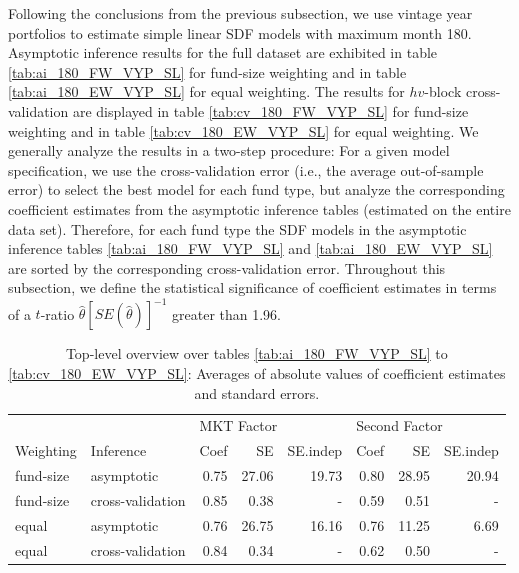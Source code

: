\documentclass[12pt]{article}
\begin{document}
Following the conclusions from the previous subsection, we use vintage year portfolios to estimate simple linear SDF models with maximum month 180.
Asymptotic inference results for the full dataset are exhibited in table \ref{tab:ai_180_FW_VYP_SL} for fund-size weighting and in table \ref{tab:ai_180_EW_VYP_SL} for equal weighting.
The results for $hv$-block cross-validation are displayed in table \ref{tab:cv_180_FW_VYP_SL} for fund-size weighting and in table \ref{tab:cv_180_EW_VYP_SL} for equal weighting.
We generally analyze the results in a two-step procedure: For a given model specification, we use the cross-validation error (i.e., the average out-of-sample error) to select the best model for each fund type, but analyze the corresponding coefficient estimates from the asymptotic inference tables (estimated on the entire data set).
Therefore, for each fund type the SDF models in the asymptotic inference tables \ref{tab:ai_180_FW_VYP_SL} and \ref{tab:ai_180_EW_VYP_SL} are sorted by the corresponding cross-validation error.
Throughout this subsection, we define the statistical significance of coefficient estimates in terms of a $t$-ratio $\hat{\theta}[SE(\hat{\theta})]^{-1}$ greater than 1.96.

\begin{table}[ht]
	\centering
	\begin{tabular}{llrrrrrr}
		& & \multicolumn{3}{l}{MKT Factor} & \multicolumn{3}{l}{Second Factor} \\ 
		Weighting & Inference & Coef & SE & SE.indep & Coef & SE & SE.indep \\ 
		\hline
		\hline
		fund-size & asymptotic & 0.75 & 27.06 & 19.73 & 0.80 & 28.95 & 20.94 \\ 
		fund-size & cross-validation & 0.85 & 0.38 & - & 0.59 & 0.51 & - \\ 
		\hline
		equal & asymptotic & 0.76 & 26.75 & 16.16 & 0.76 & 11.25 & 6.69 \\ 
		equal & cross-validation & 0.84 & 0.34 & - & 0.62 & 0.50 & - \\ 
		\hline
		\hline
	\end{tabular}
	\caption{
		Top-level overview over tables \ref{tab:ai_180_FW_VYP_SL} to \ref{tab:cv_180_EW_VYP_SL}: 
		Averages of absolute values of coefficient estimates and standard errors.
	} 
	\label{tab:ai_sum_abs}
\end{table}
\end{document}

